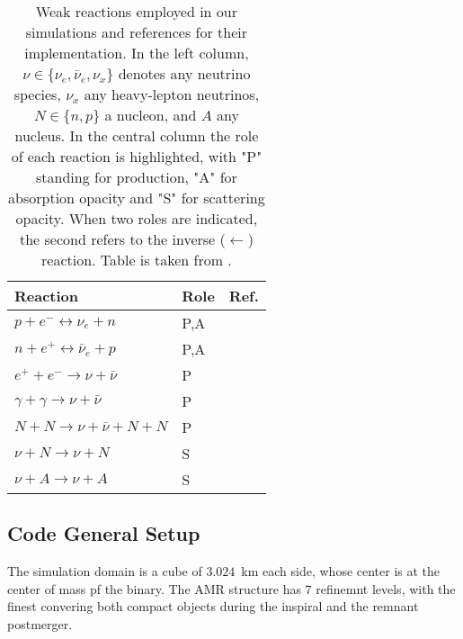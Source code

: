 \begin{table}
    \caption{
        Weak reactions employed in our simulations and references for their implementation.
        In the left column, $\nu \in \{\nu_e, \bar{\nu}_e, \nu_{x}\}$ denotes any neutrino species, 
        $\nu_{x}$ any heavy-lepton neutrinos, $N \in\{n, p\}$ a nucleon, and $A$ any nucleus.
        In the central column the role of each reaction is highlighted, with "P" standing for 
        production, "A" for absorption opacity and "S" for scattering opacity. When two roles are
        indicated, the second refers to the inverse ($\leftarrow$) reaction.
        Table is taken from \cite{Radice:2018pdn}.
    }
    \label{tab:leakage}
    \begin{center}
        \begin{tabular}{lll}
            \hline\hline
            Reaction & Role &  Ref. \\ 
            \hline
            $p + e^- \leftrightarrow \nu_e + n $          & P,A & \cite{Bruenn:1985}  \\
            $n + e^+ \leftrightarrow \bar{\nu}_{e} + p $  & P,A & \cite{Bruenn:1985}  \\
            $e^+ + e^- \rightarrow \nu + \bar{\nu}$       & P & \cite{Ruffert:1995fs} \\
            $\gamma + \gamma \rightarrow \nu + \bar{\nu}$ & P & \cite{Ruffert:1995fs} \\
            $N + N \rightarrow \nu + \bar{\nu} + N  + N$  & P & \cite{Burrows:2004vq} \\
            $\nu + N \rightarrow \nu + N$                 & S & \cite{Ruffert:1995fs} \\
            $\nu + A \rightarrow \nu + A$                 & S & \cite{Shapiro:1983du} \\
            \hline\hline
        \end{tabular}
    \end{center}
\end{table}


\subsection{Code General Setup}



The simulation domain is a cube of $3.024$~km each side, whose center is at the center of mass pf the binary.
The AMR structure has $7$ refinemnt levels, with the finest convering both compact objects during the inspiral and the remnant postmerger.

